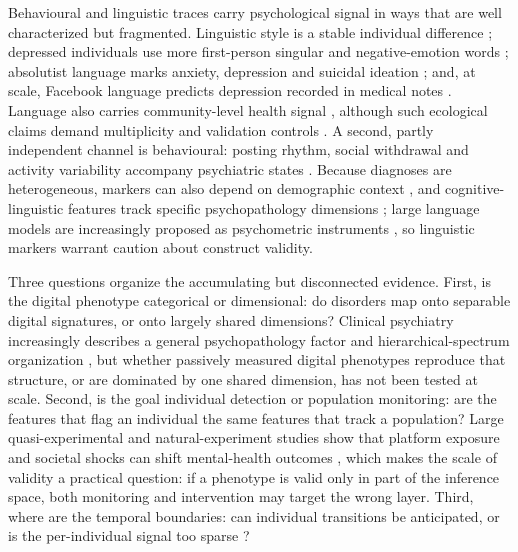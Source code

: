 \documentclass[11pt]{article}
\begin{document}
Behavioural and linguistic traces carry psychological signal in ways that are well
characterized but fragmented. Linguistic style is a stable individual difference
\cite{pennebaker1999linguistic,pennebaker2003psychological,schwartz2013personality,
kern2014online}; depressed individuals use more first-person singular and negative-emotion
words \cite{rude2004language,stirman2001word}; absolutist language marks anxiety, depression
and suicidal ideation \cite{almosaiwi2018absolute}; and, at scale, Facebook language predicts
depression recorded in medical notes \cite{eichstaedt2018facebook}. Language also carries
community-level health signal \cite{eichstaedt2015heart}, although such ecological claims
demand multiplicity and validation controls \cite{brown2018replicationstatements}. A second,
partly independent channel is behavioural: posting rhythm, social withdrawal and activity
variability accompany psychiatric states
\cite{dechoudhury2016discovering,coppersmith2014quantifying}. Because diagnoses are
heterogeneous, markers can also depend on demographic context
\cite{rai2024race,defreitas2024black,wang2024llm,hur2024sentiment}, and cognitive-linguistic
features track specific psychopathology dimensions \cite{fradkin2025language}; large language
models are increasingly proposed as psychometric instruments \cite{capraro2025llmwellbeing},
so linguistic markers warrant caution about construct validity.

Three questions organize the accumulating but disconnected evidence. First, is the digital
phenotype categorical or dimensional: do disorders map onto separable digital signatures, or
onto largely shared dimensions? Clinical psychiatry increasingly describes a general
psychopathology factor and hierarchical-spectrum organization
\cite{caspi2014p,kotov2017hitop,rodriguezseijas2023diversity,pnas2023pfactor}, but whether
passively measured digital phenotypes reproduce that structure, or are dominated by one shared
dimension, has not been tested at scale. Second, is the goal individual detection or
population monitoring: are the features that flag an individual the same features that track a
population? Large quasi-experimental and natural-experiment studies show that platform exposure
and societal shocks can shift mental-health outcomes
\cite{braghieri2022social,allcott2020welfare,shi2026protests,roozenbeek2026protests,
skeggs2025interventions,fassi2025adolescents,pearson2025smartphones}, which makes the scale of
validity a practical question: if a phenotype is valid only in part of the inference space,
both monitoring and intervention may target the wrong layer. Third, where are the temporal
boundaries: can individual transitions be anticipated, or is the per-individual signal too
sparse \cite{giampetruzzi2026promise,dechoudhury2016discovering}?
\end{document}
